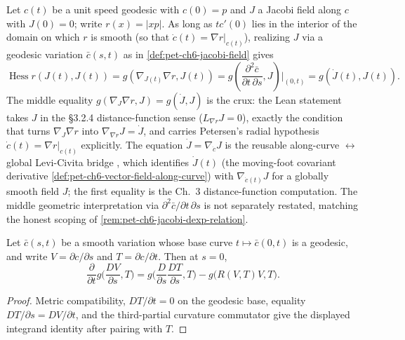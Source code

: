 \begin{remark}
  \label{rem:pet-ch6-jacobi-hessian-r}


  Let $c(t)$ be a unit speed geodesic with $c(0)=p$ and $J$ a Jacobi field
  along $c$ with $J(0)=0$; write $r(x)=|xp|$. As long as $tc'(0)$ lies in the
  interior of the domain on which $r$ is smooth (so that $\dot c(t)=\nabla
  r|_{c(t)}$), realizing $J$ via a geodesic variation $\bar c(s,t)$ as in
  \cref{def:pet-ch6-jacobi-field} gives
  \[
    \operatorname{Hess}r(J(t),J(t))=g(\nabla_{J(t)}\nabla r,J(t))
    =g\!\left(\frac{\partial^2\bar c}{\partial t\,\partial s},J\right)\Big|_{(0,t)}
    =g(\dot J(t),J(t)).
  \]
  The middle equality $g(\nabla_{J}\nabla r,J)=g(\dot J,J)$ is the crux: the
  Lean statement takes $J$ in the \S3.2.4 distance-function sense
  ($L_{\nabla r}J=0$), exactly the condition that turns
  $\nabla_{J}\nabla r$ into $\nabla_{\nabla r}J=\dot J$, and carries Petersen's
  radial hypothesis $\dot c(t)=\nabla r|_{c(t)}$ explicitly. The equation
  $\dot J=\nabla_{\dot c}J$ is the reusable along-curve $\leftrightarrow$ global
  Levi-Civita bridge , which
  identifies $\dot J(t)$ (the moving-foot covariant derivative
  \cref{def:pet-ch6-vector-field-along-curve}) with $\nabla_{\dot c(t)}J$ for a
  globally smooth field $J$; the first equality is the Ch.~3
  distance-function computation. The middle geometric interpretation via
  $\partial^2\bar c/\partial t\,\partial s$ is not separately restated, matching
  the honest scoping of \cref{rem:pet-ch6-jacobi-dexp-relation}.
\end{remark}

\begin{lemma}
  \label{lem:pet-ch6-second-variation-integrand}


  Let $\bar c(s,t)$ be a smooth variation whose base curve $t\mapsto\bar c(0,t)$ is
  a geodesic, and write $V=\partial c/\partial s$ and $T=\partial c/\partial t$.
  Then at $s=0$,
  \[
    \frac{\partial}{\partial t}g\Big(\frac{DV}{\partial s},T\Big)
      =g\Big(\frac{D}{\partial s}\frac{DT}{\partial s},T\Big)-g\big(R(V,T)V,T\big).
  \]
\end{lemma}
\begin{proof}
  \sketch
  Metric compatibility, \(DT/\partial t=0\) on the geodesic base, equality \(DT/\partial s=DV/\partial t\), and the third-partial curvature commutator give the displayed integrand identity after pairing with \(T\).
\end{proof}



